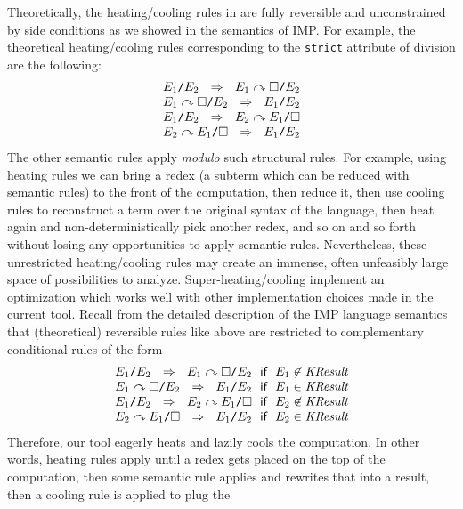 \documentclass{article}
\begin{document}
\begin{kdefinition}
\begin{kblock}[text]
Theoretically, the heating/cooling rules in \K are fully reversible and
unconstrained by side conditions as we showed in the semantics of IMP\@.
For example, the theoretical heating/cooling rules corresponding to the
\texttt{strict} attribute of division are the following:
$$
\begin{array}{l}
E_1 \texttt{/} E_2 \ \ \Rightarrow \ \ E_1 \curvearrowright \square \texttt{/} E_2 \\
E_1 \curvearrowright \square \texttt{/} E_2 \ \ \Rightarrow \ \ E_1 \texttt{/} E_2 \\
E_1 \texttt{/} E_2 \ \ \Rightarrow \ \ E_2 \curvearrowright E_1 \texttt{/} \square \\
E_2 \curvearrowright E_1 \texttt{/} \square \ \ \Rightarrow \ \ E_1 \texttt{/} E_2
\end{array}
$$
The other semantic rules apply {\em modulo} such structural rules.
For example, using heating rules we can bring a redex (a subterm which
can be reduced with semantic rules) to the front of the computation,
then reduce it, then use cooling rules to reconstruct a term over the
original syntax of the language, then heat again and
non-deterministically pick another redex, and so on and so forth
without losing any opportunities to apply semantic rules.
Nevertheless, these unrestricted heating/cooling rules may create an
immense, often unfeasibly large space of possibilities to analyze.
Super-heating/cooling implement an optimization which works well with
other implementation choices made in the current \K tool.  Recall from
the detailed description of the IMP language semantics that
(theoretical) reversible rules like above are restricted to complementary
conditional rules of the form
$$
\begin{array}{l}
E_1 \texttt{/} E_2 \ \ \Rightarrow \ \ E_1 \curvearrowright \square \texttt{/} E_2
\ \ \textsf{if} \ \ E_1\not\in\textit{KResult} \\
E_1 \curvearrowright \square \texttt{/} E_2 \ \ \Rightarrow \ \ E_1 \texttt{/} E_2
\ \ \textsf{if} \ \ E_1\in\textit{KResult} \\
E_1 \texttt{/} E_2 \ \ \Rightarrow \ \ E_2 \curvearrowright E_1 \texttt{/} \square
\ \ \textsf{if} \ \ E_2 \not\in\textit{KResult} \\
E_2 \curvearrowright E_1 \texttt{/} \square \ \ \Rightarrow \ \ E_1 \texttt{/} E_2
\ \ \textsf{if} \ \ E_2 \in \textit{KResult}
\end{array}
$$
Therefore, our tool eagerly heats and lazily cools the computation.
In other words, heating rules apply until a redex gets placed on the
top of the computation, then some semantic rule applies and rewrites
that into a result, then a cooling rule is applied to plug the

\end{kblock}
\end{kdefinition}
\end{document}
